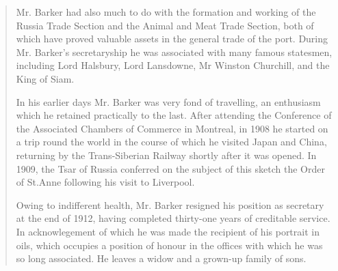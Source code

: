 \begin{quotation}
Mr. Barker had also much to do with the formation and working of the Russia Trade Section and the Animal and Meat Trade Section, both of which have proved valuable assets in the general trade of the port. During Mr. Barker's secretaryship he was associated with many famous statesmen, including Lord Halsbury, Lord Lansdowne, Mr Winston Churchill, and the King of Siam.

In his earlier days Mr. Barker was very fond of travelling, an enthusiasm which he retained practically to the last. After attending the Conference of the Associated Chambers of Commerce in Montreal, in 1908 he started on a trip round the world in the course of which he visited Japan and China, returning by the Trans-Siberian Railway shortly after it was opened.  In 1909, the Tsar of Russia conferred on the subject of this sketch the Order of St.Anne following his visit to Liverpool.

Owing to indifferent health, Mr. Barker resigned his position as secretary at the end of 1912, having completed thirty-one years of creditable service. In acknowlegement of which he was made the recipient of his portrait in oils, which occupies a position of honour in the offices with which he was so long associated.  He leaves a widow and a grown-up family of sons.
\end{quotation} \cite{LiverpoolPost1917}
